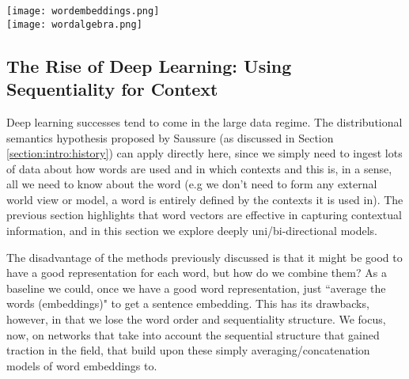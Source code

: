 {{\begin{center}
	\texttt{[image: wordembeddings.png]} \\
	\texttt{[image: wordalgebra.png]}
	\label{fig:background:wordembeddings}
\end{center}

\subsection{The Rise of Deep Learning: Using Sequentiality for Context} \label{section:background:bidirectional}
Deep learning successes tend to come in the large data regime. The distributional semantics hypothesis proposed by Saussure (as discussed in Section \ref{section:intro:history}) can apply directly here, since we simply need to ingest lots of data about how words are used and in which contexts and this is, in a sense, all we need to know about the word (e.g we don't need to form any external world view or model, a word is entirely defined by the contexts it is used in). The previous section highlights that word vectors are effective in capturing contextual information, and in this section we explore deeply uni/bi-directional models.

The disadvantage of the methods previously discussed is that it might be good to have a good representation for each word, but how do we combine them? As a baseline we could, once we have a good word representation, just ``average the words (embeddings)" to get a sentence embedding. This has its drawbacks, however, in that we lose the word order and sequentiality structure. We focus, now, on networks that take into account the sequential structure that gained traction in the field, that build upon these simply averaging/concatenation models of word embeddings to.

}}
